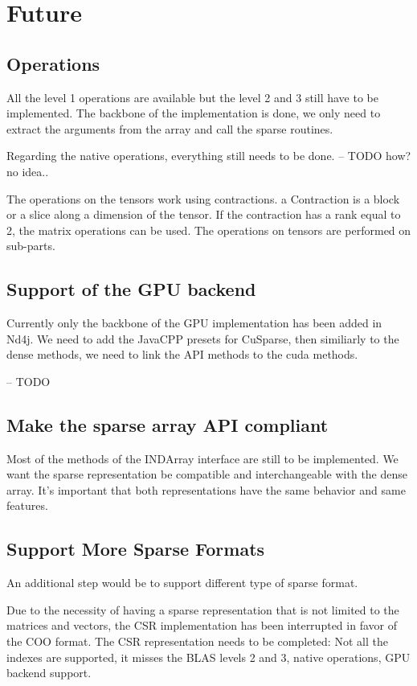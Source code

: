 \chapter{Future}

\section{Operations}

All the level 1 operations are available but the level 2 and 3 still have to be implemented. The backbone of the implementation is done, we only need to extract the arguments from the array and call the sparse routines.

Regarding the native operations, everything still needs to be done.
-- TODO how? no idea..

The operations on the tensors work using contractions. a Contraction is a block or a slice along a dimension of the tensor. If the contraction has a rank equal to 2, the matrix operations can be used. The operations on tensors are performed on sub-parts.

\section{Support of the GPU backend}

Currently only the backbone of the GPU implementation has been added in Nd4j. We need to add the JavaCPP presets for CuSparse, then similiarly to the dense methods, we need to link the API methods to the cuda methods.


-- TODO

\section{Make the sparse array API compliant}

Most of the methods of the INDArray interface are still to be implemented. We want the sparse representation be compatible and interchangeable with the dense array. It's important that both representations have the same behavior and same features.

\section{Support More Sparse Formats}
\label{sec:moreFormat}

An additional step would be to support different type of sparse format. 

Due to the necessity of having a sparse representation that is not limited to the matrices and vectors, the CSR implementation has been interrupted in favor of the COO format. The CSR representation needs to be completed: Not all the indexes are supported, it misses the BLAS levels 2 and 3, native operations, GPU backend support. 

